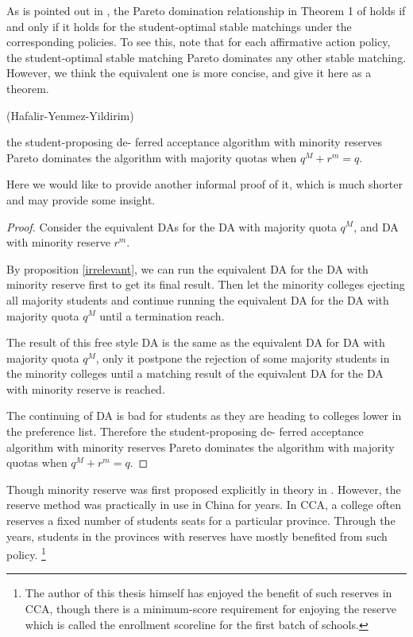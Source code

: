 As is pointed out in \parencite{Hafalir2013}, the Pareto domination relationship in Theorem 1 of \parencite{Hafalir2013} holds if and only if it holds for the student-optimal stable matchings under the corresponding policies. To see this, note that for each affirmative action policy, the
student-optimal stable matching Pareto dominates any other stable matching. However, we think the equivalent one is more concise, and give it
here as a theorem.
\begin{thm*}(Hafalir-Yenmez-Yildirim)
  
the student-proposing de-
ferred acceptance algorithm with minority reserves Pareto dominates the algorithm
with majority quotas when $q^M + r^m= q$.
\end{thm*}
Here we would like to provide another informal proof of it, which is much shorter and may provide some insight.
\begin{proof}
Consider the equivalent DAs for the DA with majority quota $q^M$, and DA with minority reserve $r^m$.
  
By proposition \ref{irrelevant}, we can run the equivalent DA for the DA with minority reserve first to get its final result. Then let the minority colleges ejecting all majority students  and continue running the equivalent DA for the DA with majority quota $q^M$ until a termination reach.

The result of this free style DA is the same as the equivalent DA for DA with majority quota $q^M$, only it postpone the rejection of some majority students in the minority colleges until a matching result of the equivalent DA for the DA with minority reserve is reached.

The continuing of DA is bad for students as they are heading to colleges lower in the preference list. Therefore the student-proposing de-
ferred acceptance algorithm with minority reserves Pareto dominates the algorithm
with majority quotas when $q^M + r^m= q$.


\end{proof}


Though minority reserve was first proposed explicitly in theory in \parencite{Hafalir2013}. However, the reserve method was practically in use in China for years. In CCA, a college often reserves a fixed number of students seats for a particular province. Through the years, students in the provinces with reserves have mostly benefited from such policy. \footnote{ The author of this thesis himself has enjoyed the benefit of such reserves in CCA, though there is a minimum-score requirement for enjoying the reserve which is called the enrollment scoreline for the first batch of schools.  } 
  
